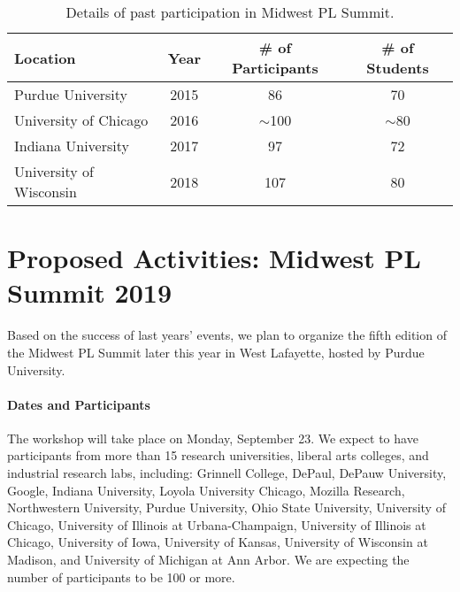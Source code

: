\documentclass[11pt]{article}
\newcommand{\parahead}[1]{\paragraph{#1}}
\begin{document}
\begin{table}[hb]
\centering
\begin{tabular}{lccc}
{\bf Location} & {\bf Year} & {\bf \# of Participants} & {\bf \# of Students} \\
\hline
Purdue University & 2015 & 86 & 70\\
University of Chicago & 2016 & $\sim$100 & $\sim$80\\
Indiana University & 2017 & 97 & 72\\
University of Wisconsin & 2018 & 107 & 80
\end{tabular}
\caption{Details of past participation in Midwest PL Summit.}
\label{tab:participants}
\end{table}



\section{Proposed Activities: Midwest PL Summit 2019}

Based on the success of last years' events, we plan to organize the
fifth edition of the Midwest PL Summit later this year in West Lafayette, hosted by Purdue University.

\parahead{Dates and Participants}

The workshop will take place on Monday, September 23.
We expect to have participants
from more than 15 research universities, liberal arts colleges, and
industrial research labs, including:
Grinnell College,
DePaul,
DePauw University,
Google,
Indiana University,
Loyola University Chicago,
Mozilla Research,
Northwestern University,
Purdue University,
Ohio State University,
University of Chicago,
University of Illinois at Urbana-Champaign,
University of Illinois at Chicago,
University of Iowa,
University of Kansas,
University of Wisconsin at Madison, and
University of Michigan at Ann Arbor.
We are expecting the number
of participants to be 100 or more.
\end{document}
